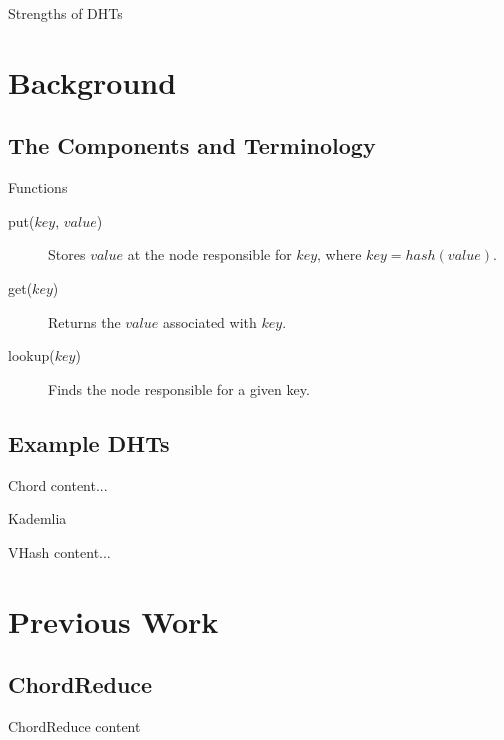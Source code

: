 \documentclass[11pt,aspectratio=169]{beamer}
\begin{document}
\begin{frame}{Strengths of DHTs }
	
\end{frame}




\section{Background}

\subsection{The Components and Terminology}
\begin{frame}{Functions}
	\begin{description}
		\item[put($ key $, $ value $)] Stores $value$ at the node responsible for $key$, where $key =  hash(value)$.
		\item[get($ key $)] Returns the $ value $ associated with $key$.
		\item[lookup($ key $)] Finds the node responsible for a given key.
	\end{description}
\end{frame}


\subsection{Example DHTs}

\begin{frame}{Chord}
	content...
\end{frame}

\begin{frame}{Kademlia}
\end{frame}

\begin{frame}{VHash}
	content...
\end{frame}
\section{Previous Work}

\subsection{ChordReduce}

\begin{frame}{ChordReduce}
	content
\end{frame}
\end{document}
